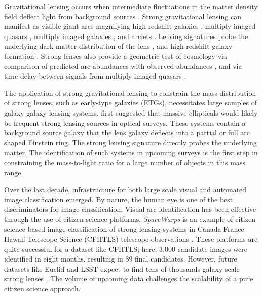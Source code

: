 \documentclass{emulateapj}
\begin{document}
Gravitational lensing occurs when intermediate fluctuations in the
matter density field deflect light from background sources
\citep[see][for a review]{kneibandnatarajan_11}.  Strong gravitational
lensing can manifest as visible giant arcs magnifying high redshift
galaxies \citep{lyndsandpetrosian_86,gladders_etal03}, multiply imaged
quasars \citep{walsh_etal79}, multiply imaged galaxies
\citep{sharon_etal05}, and arclets \citep{bezecourt_etal98}.  Lensing
signatures probe the underlying dark matter distribution of the lens
\citep{warrenanddye_03}, and high redshift galaxy formation
\citep{allam_etal07}. Strong lenses also provide a geometric test of
cosmology via comparison of predicted arc abundances with observed
abundances \citep{kochanek_96,chae_03,linder_04}, and via time-delay
between signals from multiply imaged quasars
\citep{xli_etal12,suyu_etal14,suyu_etal16}.

The application of strong gravitational lensing to constrain the mass
distribution of strong lenses, such as early-type galaxies (ETGs),
necessitates large samples of galaxy-galaxy lensing systems.
\citet{miraldaescudeandlehar_92} first suggested that massive
ellipticals would likely be frequent strong lensing sources in optical
surveys.  These systems contain a background source galaxy that the
lens galaxy deflects into a partial or full arc shaped Einstein ring.
The strong lensing signature directly probes the underlying matter.
The identification of such systems in upcoming surveys is the first
step in constraining the mass-to-light ratio for a large number of
objects in this mass range.

Over the last decade, infrastructure for both large scale visual and
automated image classification emerged. By nature, the human eye is
one of the best discriminators for image classification.  Visual arc
identification has been effective through the use of citizen science
platforms.  {\em SpaceWarps} is an example of citizen science based
image classification of strong lensing systems in Canada France Hawaii
Telescope Science (CFHTLS) telescope observations
\citep{marshall_etal16,more_etal16}.  These platforms are quite
successful for a dataset like CFHTLS; here, 3,000 candidate images
were identified in eight months, resulting in 89 final candidates.
However, future datasets like Euclid \citep{oguriandmarshall_10} and
LSST expect to find tens of thousands galaxy-scale strong lenses
\citep{pawase_etal12}.  The volume of upcoming data challenges the
scalability of a pure citizen science approach.
\end{document}
